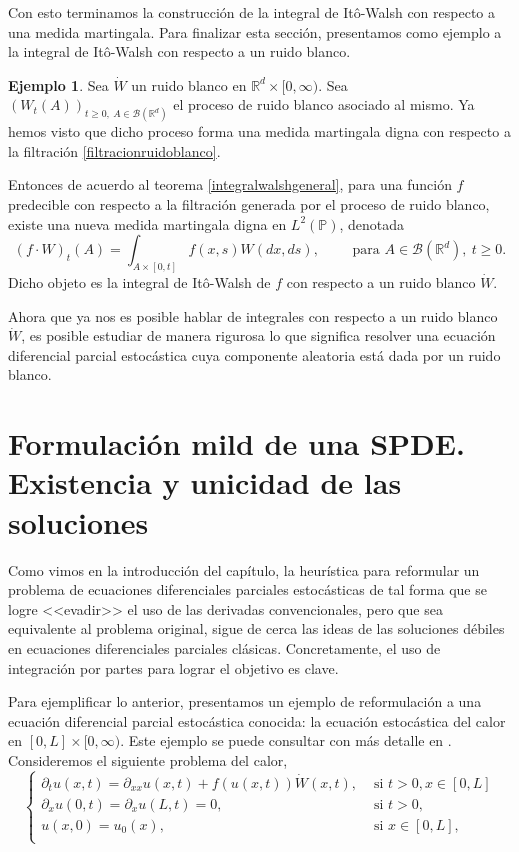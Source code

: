 \documentclass[letterpaper,twoside,12pt]{book}
\newcommand{\R}{\mathbb{R}}
\newcommand{\B}{\mathcal{B}}
\renewcommand{\P}{\mathbb{P}}
\newcommand{\W}{\dot{W}}
\newcommand{\1}{\mathds{1}}
\theoremstyle{definition}
\theoremstyle{definition}
\theoremstyle{remark}
\theoremstyle{definition}
\theoremstyle{definition}
\theoremstyle{definition}
\theoremstyle{definition}
\newtheorem{ejem}{Ejemplo}
\theoremstyle{definition}
\begin{document}
  Con esto terminamos la construcción de la integral de Itô-Walsh con respecto a una medida martingala. Para finalizar esta sección, presentamos como ejemplo a la integral de Itô-Walsh con respecto a un ruido blanco.
  \begin{ejem} 
   Sea $\dot W$ un ruido blanco en $\R^{d}\times [0,\infty)$. Sea $(W_t(A))_{t\geq0, \ A\in \B(\R^{d})}$ el proceso de ruido blanco asociado al mismo. Ya hemos visto que dicho proceso forma una medida martingala digna con respecto a la filtración \eqref{filtracionruidoblanco}. 

   Entonces de acuerdo al teorema \ref{integralwalshgeneral}, para una función $f$ predecible con respecto a la filtración generada por el proceso de ruido blanco, existe una nueva medida martingala digna en $L^2(\P)$, denotada 
   \[
   (f\cdot W)_t(A)=\int_{A\times [0,t]}f(x,s)W(dx,ds), \qquad \text{ para } A\in \B(\R^{d}), \ t\geq0.
   \]
   Dicho objeto es la integral de Itô-Walsh de $f$ con respecto a un ruido blanco $\dot W$.
   \end{ejem}
  
   Ahora que ya nos es posible hablar de integrales con respecto a un ruido blanco $\W$, es posible estudiar de manera rigurosa lo que significa resolver una  ecuación diferencial parcial estocástica cuya componente aleatoria está dada por un ruido blanco.

\section{Formulación mild de una SPDE. Existencia y unicidad de las soluciones}
Como vimos en la introducción del capítulo, la heurística para reformular un problema de ecuaciones diferenciales parciales estocásticas de tal forma que se logre <<evadir>> el uso de las derivadas convencionales, pero que sea equivalente al problema original, sigue de cerca las ideas de las soluciones débiles en ecuaciones diferenciales parciales clásicas. Concretamente, el uso de integración por partes para lograr el objetivo es clave. 

Para ejemplificar lo anterior, presentamos un ejemplo de reformulación a una ecuación diferencial parcial estocástica conocida: la ecuación estocástica del calor en $[0,L]\times[0,\infty)$. Este ejemplo se puede consultar con más detalle en \cite[pp. 23 - 32]{Khoshnevisan2009}. Consideremos el siguiente problema del calor,
\begin{equation}\label{calorejemplo}
   \begin{cases}
      \partial_tu(x,t)=\partial_{xx}u(x,t)+f(u(x,t))\W(x,t), & \text{ si } t>0, x\in [0,L]\\
      \partial_xu(0,t)=\partial_xu(L,t)=0, & \text{ si } t>0,\\
      u(x,0)=u_0(x), & \text{ si } x\in [0,L],\\
   \end{cases}
\end{equation}
\end{document}
